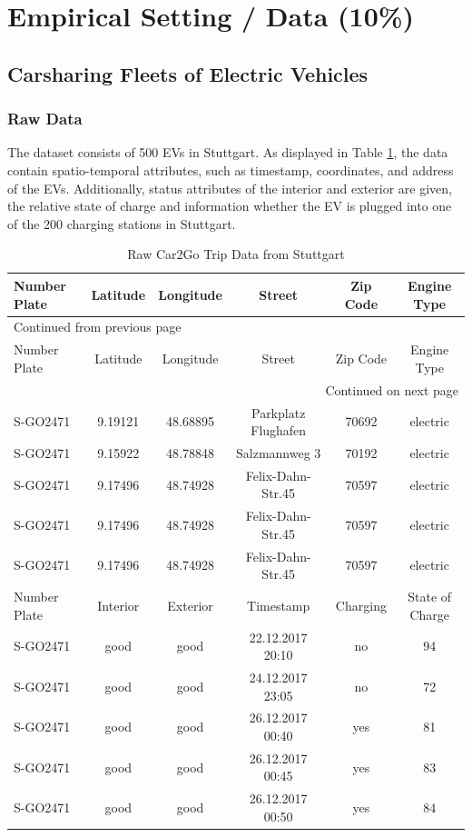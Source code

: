 \documentclass[a4paper, twoside, 12pt]{article}
\begin{document}
\section{Empirical Setting / Data (10\%)}
\label{sec:org3b0643e}
\subsection{Carsharing Fleets of Electric Vehicles}
\label{sec:org6f8596e}
\subsubsection{Raw Data}
\label{sec:org487aea7}
The dataset consists of 500 EVs in Stuttgart. As displayed in Table
\ref{car2go-sample-data}, the data contain spatio-temporal attributes, such as
timestamp, coordinates, and address of the EVs. Additionally, status attributes
of the interior and exterior are given, the relative state of charge and
information whether the EV is plugged into one of the 200 charging stations in
Stuttgart.

\begin{longtable}{l|ccccc}
\caption{Raw Car2Go Trip Data from Stuttgart \label{car2go-sample-data}}
\\
\hline
\hline
Number Plate & Latitude & Longitude & Street & Zip Code & Engine Type\\
\hline
\endfirsthead
\multicolumn{6}{l}{Continued from previous page} \\
\hline

Number Plate & Latitude & Longitude & Street & Zip Code & Engine Type \\

\hline
\endhead
\hline\multicolumn{6}{r}{Continued on next page} \\
\endfoot
\endlastfoot
\hline
S-GO2471 & 9.19121 & 48.68895 & Parkplatz Flughafen & 70692 & electric\\
S-GO2471 & 9.15922 & 48.78848 & Salzmannweg 3 & 70192 & electric\\
S-GO2471 & 9.17496 & 48.74928 & Felix-Dahn-Str.45 & 70597 & electric\\
S-GO2471 & 9.17496 & 48.74928 & Felix-Dahn-Str.45 & 70597 & electric\\
S-GO2471 & 9.17496 & 48.74928 & Felix-Dahn-Str.45 & 70597 & electric\\
\hline
Number Plate & Interior & Exterior & Timestamp & Charging & State of Charge\\
\hline
S-GO2471 & good & good & 22.12.2017 20:10 & no & 94\\
S-GO2471 & good & good & 24.12.2017 23:05 & no & 72\\
S-GO2471 & good & good & 26.12.2017 00:40 & yes & 81\\
S-GO2471 & good & good & 26.12.2017 00:45 & yes & 83\\
S-GO2471 & good & good & 26.12.2017 00:50 & yes & 84\\
\hline
\hline
\end{longtable}
\end{document}
